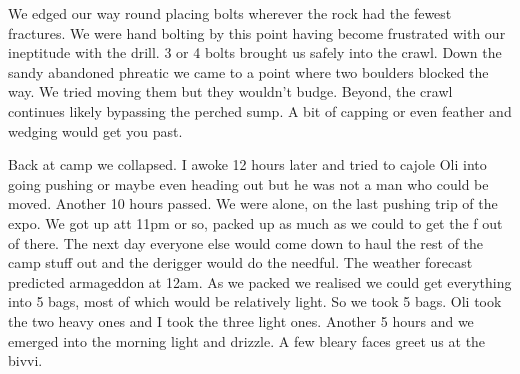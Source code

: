 We edged our way round placing bolts wherever the rock had the fewest fractures. We were hand bolting by this point having become frustrated with our ineptitude with the drill. 3 or 4 bolts brought us safely into the crawl. Down the sandy abandoned phreatic we came to a point where two boulders blocked the way. We tried moving them but they wouldn’t budge. Beyond, the crawl continues likely bypassing the perched sump. A bit of capping or even feather and wedging would get you past.
 
Back at camp we collapsed. I awoke 12 hours later and tried to cajole Oli into going pushing or maybe even heading out but he was not a man who could be moved. Another 10 hours passed.  We were alone, on the last pushing trip of the expo. We got up att 11pm or so, packed up as much as we could to get the f out of there. The next day everyone else would come down to haul the rest of the camp stuff out and the derigger would do the needful. The weather forecast predicted armageddon at 12am. As we packed we realised we could get everything into 5 bags, most of which would be relatively light. So we took 5 bags. Oli took the two heavy ones and I took the three light ones. Another 5 hours and we emerged into the morning light and drizzle. A few bleary faces greet us at the bivvi.

